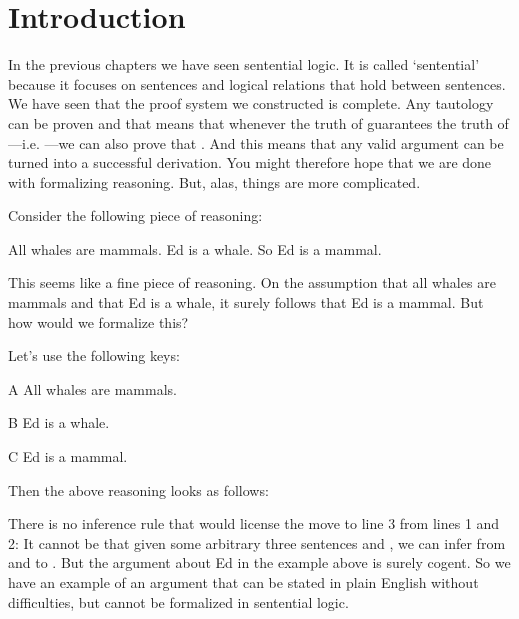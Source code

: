 

\section{Introduction}\label{secAxioms}
\newcommand{\model}{\p{\mathfrak I}}

In the previous chapters we have seen sentential logic. It is called
`sentential' because it focuses on sentences and logical relations that hold
between sentences. We have seen that the proof system we constructed is 
complete. Any tautology can be proven and that means that whenever the truth of 
 guarantees the truth of ---i.e. ---we can also prove 
that . And this means that any valid argument can be 
turned into a successful derivation. You might therefore hope that we are done 
with formalizing reasoning.  But, alas, things are more complicated.

Consider the following piece of reasoning:

\begin{Example}\label{ex:ch4-1}
 All whales are mammals. Ed is a whale. So Ed is a mammal.
\end{Example}

This seems like a fine piece of reasoning. On the assumption that all whales are 
mammals and that Ed is a whale, it surely follows that Ed is a mammal. But how 
would we formalize this?

Let's use the following keys:

\begin{lkey*}
\item[A] All whales are mammals.
\item[B] Ed is a whale.
\item[C] Ed is a mammal.
\end{lkey*}

Then the above reasoning looks as follows:

\begin{argument}
 \aitem {}
 \aitem {}
 \aitem {}
\end{argument}


There is no inference rule that would license the move to line 3 from lines 1 
and 2: It cannot be that given some arbitrary three sentences  and 
, we can infer from  and  to        
. But the argument about Ed in the example above is 
surely cogent. So we have an example of an argument that can be stated in plain 
English without difficulties, but cannot be formalized in sentential logic. 

